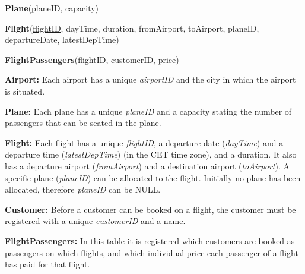 \documentclass[12pt,a4paper]{article}
\begin{document}
\vspace{0.3em}
\textbf{Plane}(\underline{planeID}, capacity)

\vspace{0.3em}
\textbf{Flight}(\underline{flightID}, dayTime, duration, fromAirport, toAirport, planeID, departureDate, latestDepTime)

\vspace{0.3em}
\textbf{FlightPassengers}(\underline{flightID}, \underline{customerID}, price)

\vspace{1em}
\noindent\textbf{Airport:} Each airport has a unique \textit{airportID} and the city in which the airport is situated.

\noindent\textbf{Plane:} Each plane has a unique \textit{planeID} and a capacity stating the number of passengers that can be seated in the plane.

\noindent\textbf{Flight:} Each flight has a unique \textit{flightID}, a departure date (\textit{dayTime}) and a departure time (\textit{latestDepTime}) (in the CET time zone), and a duration. It also has a departure airport (\textit{fromAirport}) and a destination airport (\textit{toAirport}). A specific plane (\textit{planeID}) can be allocated to the flight. Initially no plane has been allocated, therefore \textit{planeID} can be NULL.

\noindent\textbf{Customer:} Before a customer can be booked on a flight, the customer must be registered with a unique \textit{customerID} and a name.

\noindent\textbf{FlightPassengers:} In this table it is registered which customers are booked as passengers on which flights, and which individual price each passenger of a flight has paid for that flight.

\vspace{1em}
\end{document}
